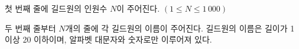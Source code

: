 첫 번째 줄에 길드원의 인원수 $N$이 주어진다. $(1 \le N \le 1\,000)$

두 번째 줄부터 $N$개의 줄에 각 길드원의 이름이 주어진다. 길드원의 이름은 길이가 1 이상 20 이하이며, 알파벳 대문자와 숫자로만 이루어져 있다.